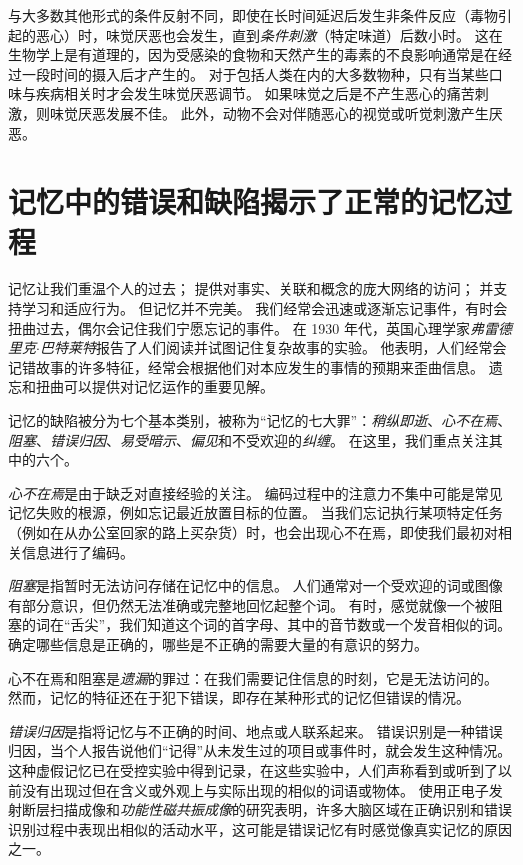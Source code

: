 与大多数其他形式的条件反射不同，即使在长时间延迟后发生非条件反应（毒物引起的恶心）时，味觉厌恶也会发生，直到\textit{条件刺激}（特定味道）后数小时。
这在生物学上是有道理的，因为受感染的食物和天然产生的毒素的不良影响通常是在经过一段时间的摄入后才产生的。
对于包括人类在内的大多数物种，只有当某些口味与疾病相关时才会发生味觉厌恶调节。
如果味觉之后是不产生恶心的痛苦刺激，则味觉厌恶发展不佳。
此外，动物不会对伴随恶心的视觉或听觉刺激产生厌恶。



\section{记忆中的错误和缺陷揭示了正常的记忆过程}

记忆让我们重温个人的过去； 提供对事实、关联和概念的庞大网络的访问； 并支持学习和适应行为。 但记忆并不完美。
我们经常会迅速或逐渐忘记事件，有时会扭曲过去，偶尔会记住我们宁愿忘记的事件。
在 1930 年代，英国心理学家\textit{弗雷德里克$\cdot$巴特莱特}报告了人们阅读并试图记住复杂故事的实验。
他表明，人们经常会记错故事的许多特征，经常会根据他们对本应发生的事情的预期来歪曲信息。
遗忘和扭曲可以提供对记忆运作的重要见解。


记忆的缺陷被分为七个基本类别，被称为“记忆的七大罪”：\textit{稍纵即逝}、\textit{心不在焉}、\textit{阻塞}、\textit{错误归因}、\textit{易受暗示}、\textit{偏见}和不受欢迎的\textit{纠缠}。
在这里，我们重点关注其中的六个。


\textit{心不在焉}是由于缺乏对直接经验的关注。
编码过程中的注意力不集中可能是常见记忆失败的根源，例如忘记最近放置目标的位置。
当我们忘记执行某项特定任务（例如在从办公室回家的路上买杂货）时，也会出现心不在焉，即使我们最初对相关信息进行了编码。


\textit{阻塞}是指暂时无法访问存储在记忆中的信息。
人们通常对一个受欢迎的词或图像有部分意识，但仍然无法准确或完整地回忆起整个词。
有时，感觉就像一个被阻塞的词在“舌尖”，我们知道这个词的首字母、其中的音节数或一个发音相似的词。
确定哪些信息是正确的，哪些是不正确的需要大量的有意识的努力。


心不在焉和阻塞是\textit{遗漏}的罪过：在我们需要记住信息的时刻，它是无法访问的。
然而，记忆的特征还在于犯下错误，即存在某种形式的记忆但错误的情况。


\textit{错误归因}是指将记忆与不正确的时间、地点或人联系起来。
错误识别是一种错误归因，当个人报告说他们“记得”从未发生过的项目或事件时，就会发生这种情况。
这种虚假记忆已在受控实验中得到记录，在这些实验中，人们声称看到或听到了以前没有出现过但在含义或外观上与实际出现的相似的词语或物体。
使用正电子发射断层扫描成像和\textit{功能性磁共振成像}的研究表明，许多大脑区域在正确识别和错误识别过程中表现出相似的活动水平，这可能是错误记忆有时感觉像真实记忆的原因之一。



